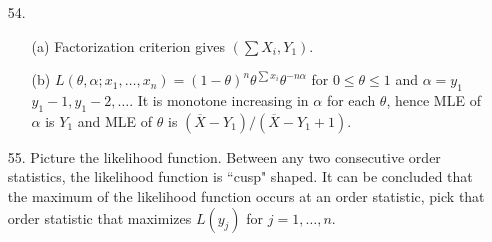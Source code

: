 \begin{enumerate}
  	\item[54.] \begin{enumerate}
  		\item[(a)] Factorization criterion gives $(\sum X_i, Y_1)$.
  		\item[(b)] $L(\theta, \alpha; x_1,\ldots,x_n) = (1-\theta)^n\theta^{\sum x_i}\theta^{-n\alpha}$ for $0\le \theta\le 1$ and $\alpha = y_1$ \\
  		$y_1-1, y_1-2,\ldots$. It is monotone increasing in $\alpha$ for each $\theta$, hence MLE of $\alpha$ is $Y_1$ and MLE of $\theta$ is $(\overline{X}-Y_1)/(\overline{X}-Y_1+1)$.
  	\end{enumerate}	

  	\item[55.] Picture the likelihood function. Between any two consecutive order statistics, the likelihood function is ``cusp" shaped. It can be concluded that the maximum of the likelihood function occurs at an order statistic, pick that order statistic that maximizes $L(y_j)$ for $j=1,\dots,n$.	
\end{enumerate}